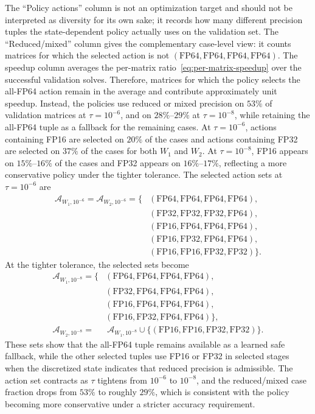 \documentclass[Afour,sageh,times]{sagej}
\theoremstyle{plain}
\theoremstyle{definition}
\begin{document}
{The ``Policy actions'' column is not an optimization target and should not be interpreted as diversity for its own sake; it records how many different precision tuples the state-dependent policy actually uses on the validation set. The ``Reduced/mixed'' column gives the complementary case-level view: it counts matrices for which the selected action is not $(\mathrm{FP64},\mathrm{FP64},\mathrm{FP64},\mathrm{FP64})$. The speedup column averages the per-matrix ratio~\eqref{eq:per-matrix-speedup} over the successful validation solves.
Therefore, matrices for which the policy selects the all-FP64 action remain in the average and contribute approximately unit speedup. Instead, the policies use reduced or mixed precision on $53\%$ of validation matrices at $\tau=10^{-6}$, and on $28\%$--$29\%$ at $\tau=10^{-8}$, while retaining the all-FP64 tuple as a fallback for the remaining cases. At $\tau=10^{-6}$, actions containing FP16 are selected on $20\%$ of the cases and actions containing FP32 are selected on $37\%$ of the cases for both $W_1$ and $W_2$. At $\tau=10^{-8}$, FP16 appears on $15\%$--$16\%$ of the cases and FP32 appears on $16\%$--$17\%$, reflecting a more conservative policy under the tighter tolerance. The selected action sets at $\tau=10^{-6}$ are
\[
\begin{aligned}
\mathcal{A}_{W_1,10^{-6}}=\mathcal{A}_{W_2,10^{-6}}=\{&
(\mathrm{FP64},\mathrm{FP64},\mathrm{FP64},\mathrm{FP64}),\\
&(\mathrm{FP32},\mathrm{FP32},\mathrm{FP32},\mathrm{FP64}),\\
&(\mathrm{FP16},\mathrm{FP64},\mathrm{FP64},\mathrm{FP64}),\\
&(\mathrm{FP16},\mathrm{FP32},\mathrm{FP64},\mathrm{FP64}),\\
&(\mathrm{FP16},\mathrm{FP16},\mathrm{FP32},\mathrm{FP32})\}.
\end{aligned}
\]
At the tighter tolerance, the selected sets become
\[
\begin{aligned}
\mathcal{A}_{W_1,10^{-8}}=\{&
(\mathrm{FP64},\mathrm{FP64},\mathrm{FP64},\mathrm{FP64}),\\
&(\mathrm{FP32},\mathrm{FP64},\mathrm{FP64},\mathrm{FP64}),\\
&(\mathrm{FP16},\mathrm{FP64},\mathrm{FP64},\mathrm{FP64}),\\
&(\mathrm{FP16},\mathrm{FP32},\mathrm{FP64},\mathrm{FP64})\},\\[2pt]
\mathcal{A}_{W_2,10^{-8}}=&\ \mathcal{A}_{W_1,10^{-8}}
\cup\{(\mathrm{FP16},\mathrm{FP16},\mathrm{FP32},\mathrm{FP32})\}.
\end{aligned}
\]
These sets show that the all-FP64 tuple remains available as a learned safe fallback, while the other selected tuples use FP16 or FP32 in selected stages when the discretized state indicates that reduced precision is admissible. The action set contracts as $\tau$ tightens from $10^{-6}$ to $10^{-8}$, and the reduced/mixed case fraction drops from $53\%$ to roughly $29\%$, which is consistent with the policy becoming more conservative under a stricter accuracy requirement.

}
\end{document}
